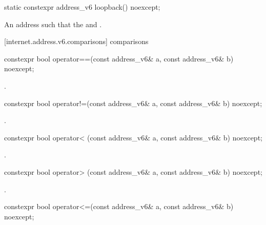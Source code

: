 \begin{itemdecl}
static constexpr address_v6 loopback() noexcept;
\end{itemdecl}

\begin{itemdescr}
\pnum
\returns An address  such that the  and .
\end{itemdescr}



[internet.address.v6.comparisons]{ comparisons}

\begin{itemdecl}
constexpr bool operator==(const address_v6& a, const address_v6& b) noexcept;
\end{itemdecl}

\begin{itemdescr}
\pnum
\returns {}.
\end{itemdescr}

\begin{itemdecl}
constexpr bool operator!=(const address_v6& a, const address_v6& b) noexcept;
\end{itemdecl}

\begin{itemdescr}
\pnum
\returns {}.
\end{itemdescr}

\begin{itemdecl}
constexpr bool operator< (const address_v6& a, const address_v6& b) noexcept;
\end{itemdecl}

\begin{itemdescr}
\pnum
\returns {}.
\end{itemdescr}

\begin{itemdecl}
constexpr bool operator> (const address_v6& a, const address_v6& b) noexcept;
\end{itemdecl}

\begin{itemdescr}
\pnum
\returns {}.
\end{itemdescr}

\begin{itemdecl}
constexpr bool operator<=(const address_v6& a, const address_v6& b) noexcept;
\end{itemdecl}


